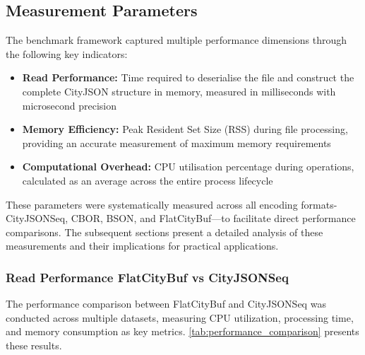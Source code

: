 

\subsection{Measurement Parameters}
\label{result:benchmark_on_local_environment:measurement_parameters}

The benchmark framework captured multiple performance dimensions through the following key indicators:

\begin{itemize}
  \item \textbf{Read Performance:} Time required to deserialise the file and construct the complete CityJSON structure in memory, measured in milliseconds with microsecond precision

  \item \textbf{Memory Efficiency:} Peak Resident Set Size (RSS) during file processing, providing an accurate measurement of maximum memory requirements

  \item \textbf{Computational Overhead:} CPU utilisation percentage during operations, calculated as an average across the entire process lifecycle

\end{itemize}

These parameters were systematically measured across all encoding formats-CityJSONSeq, CBOR, BSON, and FlatCityBuf—to facilitate direct performance comparisons. The subsequent sections present a detailed analysis of these measurements and their implications for practical applications.

\subsubsection{Read Performance FlatCityBuf vs CityJSONSeq}
\label{result:benchmark_on_local_environment:read_performance_flatcitybuf_vs_cityjsonseq}

The performance comparison between FlatCityBuf and CityJSONSeq was conducted across multiple datasets, measuring CPU utilization, processing time, and memory consumption as key metrics. \autoref{tab:performance_comparison} presents these results.

